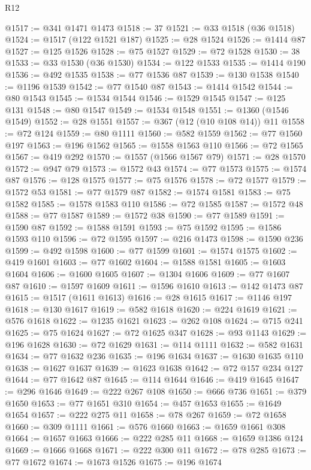 \begin{lexlean}{R12}
\begin{coremodule}
@1517 := @341 @1471 @1473
@1518 := 37
@1521 := @33 @1518 (@36 @1518)
@1524 := @1517 (@122 @1521 @187)
@1525 := @28 @1524
@1526 := @1414 @87
@1527 := @125 @1526
@1528 := @75 @1527
@1529 := @72 @1528
@1530 := 38
@1533 := @33 @1530 (@36 @1530)
@1534 := @122 @1533
@1535 := @1414 @190
@1536 := @492 @1535
@1538 := @77 @1536 @87
@1539 := @130 @1538
@1540 := @1196 @1539
@1542 := @77 @1540 @87
@1543 := @1414 @1542
@1544 := @80 @1543
@1545 := @1534 @1544
@1546 := @1529 @1545
@1547 := @125 @131
@1548 := @80 @1547
@1549 := @1534 @1548
@1551 := @1360 (@1546 @1549)
@1552 := @28 @1551
@1557 := @367 (@12 (@10 @108 @14)) @11
@1558 := @72 @124
@1559 := @80 @1111
@1560 := @582 @1559
@1562 := @77 @1560 @197
@1563 := @196 @1562
@1565 := @1558 @1563 @110
@1566 := @72 @1565
@1567 := @419 @292
@1570 := @1557 (@1566 @1567 @79)
@1571 := @28 @1570
@1572 := @947 @79
@1573 := @1572 @43
@1574 := @77 @1573
@1575 := @1574 @87
@1576 := @128 @1575
@1577 := @75 @1576
@1578 := @72 @1577
@1579 := @1572 @53
@1581 := @77 @1579 @87
@1582 := @1574 @1581
@1583 := @75 @1582
@1585 := @1578 @1583 @110
@1586 := @72 @1585
@1587 := @1572 @48
@1588 := @77 @1587
@1589 := @1572 @38
@1590 := @77 @1589
@1591 := @1590 @87
@1592 := @1588 @1591
@1593 := @75 @1592
@1595 := @1586 @1593 @110
@1596 := @72 @1595
@1597 := @216 @1473
@1598 := @1590 @236
@1599 := @492 @1598
@1600 := @77 @1599
@1601 := @1574 @1575
@1602 := @419 @1601
@1603 := @77 @1602
@1604 := @1588 @1581
@1605 := @1603 @1604
@1606 := @1600 @1605
@1607 := @1304 @1606
@1609 := @77 @1607 @87
@1610 := @1597 @1609
@1611 := @1596 @1610
@1613 := @142 @1473 @87
@1615 := @1517 (@1611 @1613)
@1616 := @28 @1615
@1617 := @1146 @197
@1618 := @130 @1617
@1619 := @582 @1618
@1620 := @224 @1619
@1621 := @576 @1618
@1622 := @1235 @1621
@1623 := @262 @108
@1624 := @715 @241
@1625 := @75 @1624
@1627 := @72 @1625 @347
@1628 := @93 @1143
@1629 := @196 @1628
@1630 := @72 @1629
@1631 := @114 @1111
@1632 := @582 @1631
@1634 := @77 @1632 @236
@1635 := @196 @1634
@1637 := @1630 @1635 @110
@1638 := @1627 @1637
@1639 := @1623 @1638
@1642 := @72 @157 @234 @127
@1644 := @77 @1642 @87
@1645 := @114 @1644
@1646 := @419 @1645
@1647 := @296 @1646
@1649 := @222 @267 @108
@1650 := @666 @736
@1651 := @379 @1650
@1653 := @77 @1651 @310
@1654 := @457 @1653
@1655 := @1649 @1654
@1657 := @222 @275 @11
@1658 := @78 @267
@1659 := @72 @1658
@1660 := @309 @1111
@1661 := @576 @1660
@1663 := @1659 @1661 @308
@1664 := @1657 @1663
@1666 := @222 @285 @11
@1668 := @1659 @1386 @124
@1669 := @1666 @1668
@1671 := @222 @300 @11
@1672 := @78 @285
@1673 := @77 @1672
@1674 := @1673 @1526
@1675 := @196 @1674

\end{coremodule}
\end{lexlean}

